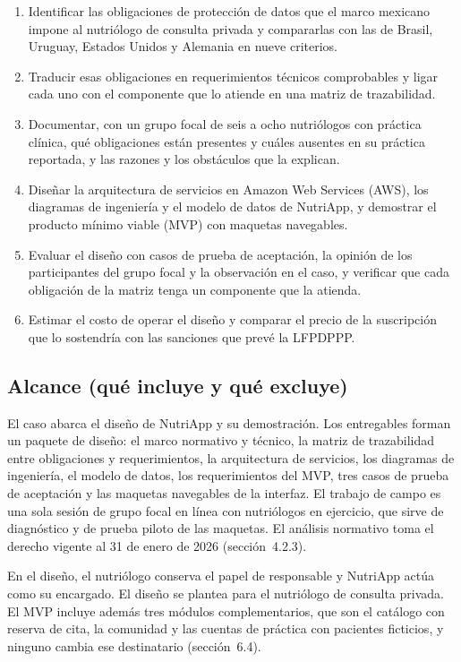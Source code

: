 \documentclass[12pt, a4paper]{article}
\begin{document}
\begin{enumerate}
  \item Identificar las obligaciones de protección de datos que el
    marco mexicano impone al nutriólogo de consulta privada y
    compararlas con las de Brasil, Uruguay, Estados Unidos y Alemania
    en nueve criterios.
  \item Traducir esas obligaciones en requerimientos técnicos
    comprobables y ligar cada uno con el componente que lo atiende en
    una matriz de trazabilidad.
  \item Documentar, con un grupo focal de seis a ocho nutriólogos con
    práctica clínica, qué obligaciones están presentes y cuáles
    ausentes en su práctica reportada, y las razones y los obstáculos
    que la explican.
  \item Diseñar la arquitectura de servicios en Amazon Web Services
    (AWS), los diagramas de ingeniería y el modelo de datos de
    NutriApp, y demostrar el producto mínimo viable (MVP) con maquetas
    navegables.
  \item Evaluar el diseño con casos de prueba de aceptación, la
    opinión de los participantes del grupo focal y la
    observación en el caso, y verificar que cada obligación de la
    matriz tenga un componente que la atienda.
  \item Estimar el costo de operar el diseño y comparar el precio de la suscripción que lo sostendría con las
    sanciones que prevé la LFPDPPP.
\end{enumerate}

\subsection{Alcance (qué incluye y qué excluye)}
El caso abarca el diseño de NutriApp y su demostración. Los
entregables forman un paquete de diseño: el marco normativo y técnico,
la matriz de trazabilidad entre obligaciones y requerimientos, la
arquitectura de servicios, los diagramas de ingeniería, el modelo de
datos, los requerimientos del MVP, tres casos
de prueba de aceptación y las maquetas navegables de la interfaz. El
trabajo de campo es una sola sesión de grupo focal en línea con
nutriólogos en ejercicio, que sirve de diagnóstico y de prueba piloto
de las maquetas. El análisis normativo toma el derecho vigente al 31
de enero de 2026 (sección~4.2.3).
 
En el diseño, el nutriólogo conserva el papel de responsable y NutriApp
actúa como su encargado. El
diseño se plantea para el nutriólogo de consulta privada. El MVP
incluye además tres módulos complementarios, que son el catálogo con
reserva de cita, la comunidad y las cuentas de práctica con pacientes
ficticios, y ninguno cambia ese destinatario (sección~6.4).
 
\end{document}
